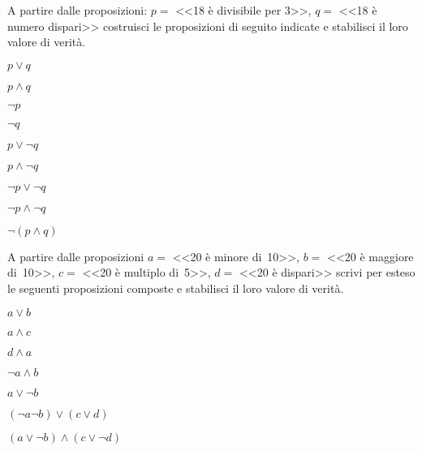 \begin{esercizio}
\label{ese:\thechapter.3}
A partire dalle proposizioni: $ p = $ <<18 è divisibile per 3>>, $ q = $ <<18
è numero dispari>> costruisci le proposizioni di seguito indicate e stabilisci il loro valore di verità.
\begin{multicols}{2}
\TabPositions{3.2cm}
\begin{enumeratea}
 \item $p\vee q$	\tab\qquad\boxV\qquad\boxF
 \item $p\wedge q$	\tab\qquad\boxV\qquad\boxF
 \item $\neg p$	\tab\qquad\boxV\qquad\boxF
 \item $\neg q$	\tab\qquad\boxV\qquad\boxF
 \item $p\vee \neg q$	\tab\qquad\boxV\qquad\boxF
 \item $p\wedge \neg q$	\tab\qquad\boxV\qquad\boxF
 \item $\neg p\vee \neg q$	\tab\qquad\boxV\qquad\boxF
 \item $\neg p\wedge \neg q$	\tab\qquad\boxV\qquad\boxF
 \item $\neg (p\wedge q)$	\tab\qquad\boxV\qquad\boxF
\end{enumeratea}
\end{multicols}
\end{esercizio}

\begin{esercizio}
\label{ese:\thechapter.4}
A partire dalle proposizioni $ a = $ <<20 è minore di~10>>, $ b = $ <<20 è maggiore
di~10>>, $ c = $ <<20 è multiplo di~5>>, $ d = $ <<20 è dispari>> scrivi per esteso le
seguenti proposizioni composte e stabilisci il loro valore di verità.
\begin{multicols}{2}
\TabPositions{3.2cm}
\begin{enumeratea}
 \item $a\vee b$	\tab\qquad\boxV\qquad\boxF
 \item $a\wedge c$	\tab\qquad\boxV\qquad\boxF
 \item $d\wedge a$	\tab\qquad\boxV\qquad\boxF
 \item $\neg a\wedge b$	\tab\qquad\boxV\qquad\boxF
 \item $a\vee \neg b$	\tab\qquad\boxV\qquad\boxF
 \item $(\neg a\neg b)\vee (c\vee d)$	\tab\qquad\boxV\qquad\boxF
 \item $(a\vee \neg b)\wedge (c\vee \neg d)$	\tab\qquad\boxV\qquad\boxF
\end{enumeratea}
\end{multicols}
\end{esercizio}

